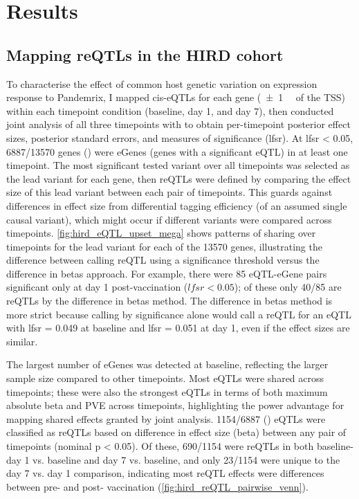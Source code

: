\section{Results}

\subsection{Mapping reQTLs in the HIRD cohort}

To characterise the effect of common host genetic variation on expression response to Pandemrix,
I mapped cis-\glspl{eQTL} for each gene (\SI{\pm1}{\mega\bp} of the \gls{TSS}) within each timepoint condition (baseline, day 1, and day 7),
then conducted joint analysis of all three timepoints with  \autocite{urbut2018FlexibleStatisticalMethods} to obtain per-timepoint posterior effect sizes, posterior standard errors, and measures of significance (\gls{lfsr}).
At \gls{lfsr} < 0.05, \num{6887/13570} genes () were eGenes (genes with a significant \gls{eQTL}) in at least one timepoint.
The most significant tested variant over all timepoints was selected as the lead variant for each gene,
then \glspl{reQTL} were defined by comparing the effect size of this lead variant between each pair of timepoints.
This guards against differences in effect size from differential tagging efficiency (of an assumed single causal variant), which might occur if different variants were compared across timepoints.
\cref{fig:hird_eQTL_upset_mega} shows patterns of sharing over timepoints for the lead variant for each of the \num{13570} genes,
illustrating the difference between calling \gls{reQTL} using a significance threshold versus the difference in betas approach.
For example, there were 85 \gls{eQTL}-eGene pairs significant only at day 1 post-vaccination ($lfsr < 0.05$); of these only \num{40/85} are \glspl{reQTL} by the difference in betas method.
The difference in betas method is more strict because calling by significance alone would call a \gls{reQTL} for an \gls{eQTL} with lfsr = 0.049 at baseline and lfsr = 0.051 at day 1, even if the effect sizes are similar.

The largest number of eGenes was detected at baseline, reflecting the larger sample size compared to other timepoints.
Most \glspl{eQTL} were shared across timepoints; 
these were also the strongest \glspl{eQTL} in terms of both maximum absolute beta and \gls{PVE} across timepoints, highlighting the power advantage for mapping shared effects granted by joint analysis.
\num{1154/6887} () \glspl{eQTL} were classified as \glspl{reQTL} based on difference in effect size (beta) between any pair of timepoints (nominal p < 0.05).
Of these, 
\num{690/1154} were \glspl{reQTL} in both baseline- day 1 vs. baseline and day 7 vs. baseline, 
and only \num{23/1154} were unique to the day 7 vs. day 1 comparison, 
indicating most \gls{reQTL} effects were differences between pre- and post- vaccination (\cref{fig:hird_reQTL_pairwise_venn}).

